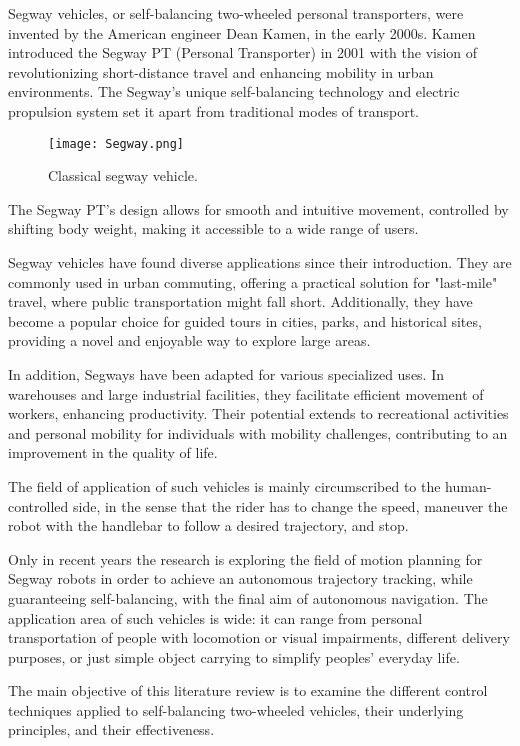 Segway vehicles, or self-balancing two-wheeled personal transporters, were invented by the American engineer Dean Kamen, in the early 2000s. Kamen introduced the Segway PT (Personal Transporter) in 2001 with the vision of revolutionizing short-distance travel and enhancing mobility in urban environments. The Segway's unique self-balancing technology and electric propulsion system set it apart from traditional modes of transport.

\begin{figure}
    \centering
    \texttt{[image: Segway.png]}
    \caption{Classical segway vehicle.}
    \label{fig:segway}
\end{figure}

The Segway PT's design allows for smooth and intuitive movement, controlled by shifting body weight, making it accessible to a wide range of users.

Segway vehicles have found diverse applications since their introduction. They are commonly used in urban commuting, offering a practical solution for "last-mile" travel, where public transportation might fall short. Additionally, they have become a popular choice for guided tours in cities, parks, and historical sites, providing a novel and enjoyable way to explore large areas.

In addition, Segways have been adapted for various specialized uses. In warehouses and large industrial facilities, they facilitate efficient movement of workers, enhancing productivity. Their potential extends to recreational activities and personal mobility for individuals with mobility challenges, contributing to an improvement in the quality of life.

The field of application of such vehicles is mainly circumscribed to the human-controlled side, in the sense that the rider has to change the speed, maneuver the robot with the handlebar to follow a desired trajectory, and stop.

Only in recent years the research is exploring the field of motion planning for Segway robots in order to achieve an autonomous trajectory tracking, while guaranteeing self-balancing, with the final aim of autonomous navigation.
The application area of such vehicles is wide: it can range from personal transportation of people with locomotion or visual impairments, different delivery purposes, or just simple object carrying to simplify peoples' everyday life.

The main objective of this literature review is to examine the different control techniques applied to self-balancing two-wheeled vehicles, their underlying principles, and their effectiveness.


